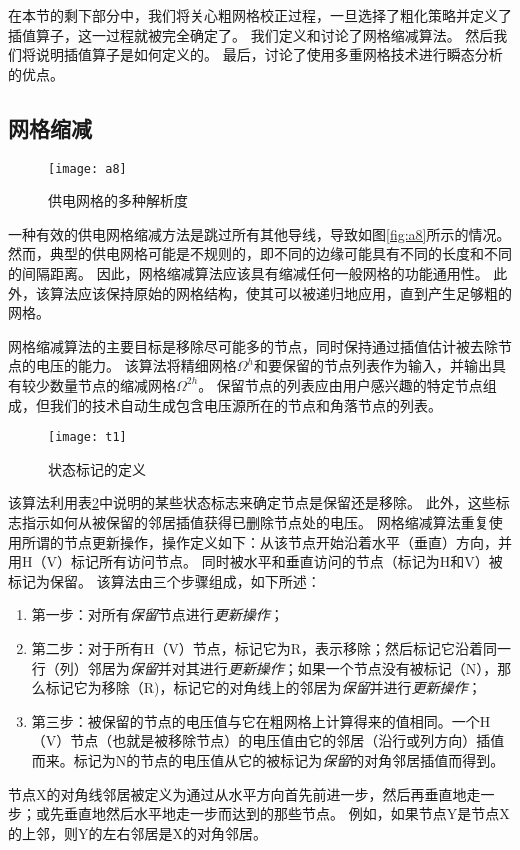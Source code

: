 在本节的剩下部分中，我们将关心粗网格校正过程，一旦选择了粗化策略并定义了插值算子，这一过程就被完全确定了。 我们定义和讨论了网格缩减算法。 然后我们将说明插值算子是如何定义的。 最后，讨论了使用多重网格技术进行瞬态分析的优点。

\subsection{网格缩减}

\begin{figure}[H] %
  \centering
  \texttt{[image: a8]}
  \caption{供电网格的多种解析度}
  \label{fig:a7}
\end{figure}

一种有效的供电网格缩减方法是跳过所有其他导线，导致如图\ref{fig:a8}所示的情况。 然而，典型的供电网格可能是不规则的，即不同的边缘可能具有不同的长度和不同的间隔距离。 因此，网格缩减算法应该具有缩减任何一般网格的功能通用性。 此外，该算法应该保持原始的网格结构，使其可以被递归地应用，直到产生足够粗的网格。

网格缩减算法的主要目标是移除尽可能多的节点，同时保持通过插值估计被去除节点的电压的能力。 该算法将精细网格$\Omega^h$和要保留的节点列表作为输入，并输出具有较少数量节点的缩减网格$\Omega^{2h}$。 保留节点的列表应由用户感兴趣的特定节点组成，但我们的技术自动生成包含电压源所在的节点和角落节点的列表。


\begin{figure}[H] %
  \centering
  \texttt{[image: t1]}
  \caption{状态标记的定义}
  \label{fig:t1}
\end{figure}

该算法利用表\ref{fig:t1}中说明的某些状态标志来确定节点是保留还是移除。 此外，这些标志指示如何从被保留的邻居插值获得已删除节点处的电压。 网格缩减算法重复使用所谓的节点更新操作，操作定义如下：从该节点开始沿着水平（垂直）方向，并用H（V）标记所有访问节点。 同时被水平和垂直访问的节点（标记为H和V）被标记为保留。 该算法由三个步骤组成，如下所述：
\begin{enumerate}
\item 第一步：对所有\emph{保留}节点进行\emph{更新操作}；
\item 第二步：对于所有H（V）节点，标记它为R，表示移除；然后标记它沿着同一行（列）邻居为\emph{保留}并对其进行\emph{更新操作}；如果一个节点没有被标记（N），那么标记它为移除（R)，标记它的对角线上的邻居为\emph{保留}并进行\emph{更新操作}；
\item 第三步：被保留的节点的电压值与它在粗网格上计算得来的值相同。一个H（V）节点（也就是被移除节点）的电压值由它的邻居（沿行或列方向）插值而来。标记为N的节点的电压值从它的被标记为\emph{保留}的对角邻居插值而得到。
\end{enumerate}
节点X的对角线邻居被定义为通过从水平方向首先前进一步，然后再垂直地走一步；或先垂直地然后水平地走一步而达到的那些节点。 例如，如果节点Y是节点X的上邻，则Y的左右邻居是X的对角邻居。

